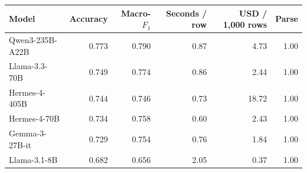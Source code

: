 \begin{tabular}{@{}lrrrrr@{}}
\toprule
Model & Accuracy & Macro-$F_1$ & Seconds / row & USD / 1{,}000 rows & Parse \\
\midrule
Qwen3-235B-A22B & 0.773 & 0.790 & 0.87 & 4.73  & 1.00 \\
Llama-3.3-70B   & 0.749 & 0.774 & 0.86 & 2.44  & 1.00 \\
Hermes-4-405B   & 0.744 & 0.746 & 0.73 & 18.72 & 1.00 \\
Hermes-4-70B    & 0.734 & 0.758 & 0.60 & 2.43  & 1.00 \\
Gemma-3-27B-it  & 0.729 & 0.754 & 0.76 & 1.84  & 1.00 \\
Llama-3.1-8B    & 0.682 & 0.656 & 2.05 & 0.37  & 1.00 \\
\bottomrule
\end{tabular}
